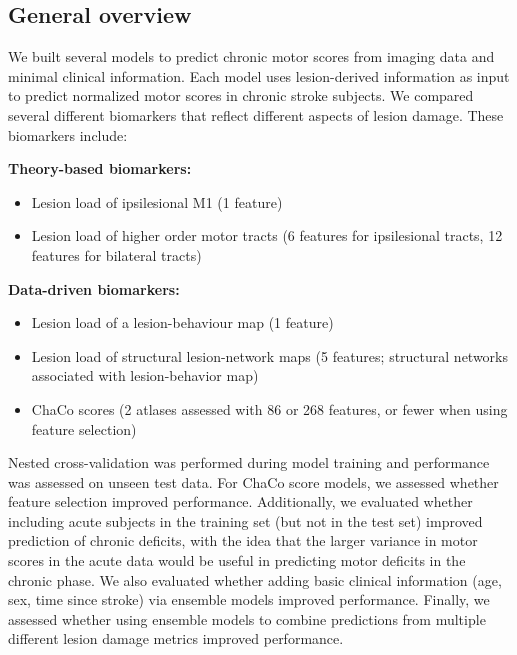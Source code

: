 \documentclass[10pt]{article}
\begin{document}
\subsection{General overview}

We built several models to predict chronic motor scores from imaging data and minimal clinical information. Each model uses lesion-derived information as input to predict normalized motor scores in chronic stroke subjects. We compared several different biomarkers that reflect different aspects of lesion damage. These biomarkers include:


\textbf{Theory-based biomarkers:}
\begin{itemize}
\item Lesion load of ipsilesional M1 (1 feature)
\item Lesion load of higher order motor tracts (6 features for ipsilesional tracts, 12 features for bilateral tracts)
\end{itemize}

\textbf{Data-driven biomarkers:}
\begin{itemize}
\item Lesion load of a lesion-behaviour map (1 feature)
\item Lesion load of structural lesion-network maps (5 features; structural networks associated with lesion-behavior map)
\item ChaCo scores (2 atlases assessed with 86 or 268 features, or fewer when using feature selection)
\end{itemize}

Nested cross-validation was performed during model training and performance was assessed on unseen test data. For ChaCo score models, we assessed whether feature selection improved performance. Additionally, we evaluated whether including acute subjects in the training set (but not in the test set) improved prediction of chronic deficits, with the idea that the larger variance in motor scores in the acute data would be useful in predicting motor deficits in the chronic phase. We also evaluated whether adding basic clinical information (age, sex, time since stroke) via ensemble models improved performance. Finally, we assessed whether using ensemble models to combine predictions from multiple different lesion damage metrics improved performance.
\end{document}
